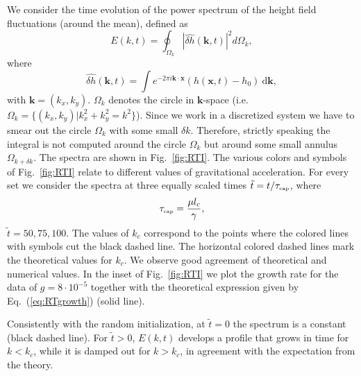 We consider the time evolution of the power spectrum of the height field fluctuations 
(around the mean), defined as 
\begin{equation}\label{eq:powerspec}
    E(k,t) = \oint_{\Omega_k} |\hat{\delta h}(\mathbf{k},t)|^2 d\Omega_k,
\end{equation}
where
\begin{equation}\label{eq:spectra}
    \hat{\delta h}(\mathbf{k},t) = \int e^{-2\pi i\mathbf{k}\cdot\mathbf{x}} (h(\mathbf{x},t)-h_0)~\mathrm{d}\mathbf{k},
\end{equation}
with $\mathbf{k}=(k_x,k_y)$. $\Omega_k$ denotes the circle in $\mathbf{k}$-space (i.e. 
$\Omega_k = \{(k_x, k_y) | k_x^2 + k_y^2 = k^2 \}$). Since we work in a discretized
system we have to smear out the circle $\Omega_k$ with some small $\delta k$. Therefore, strictly speaking 
the integral is not computed around the circle $\Omega_k$ but around some small annulus 
$\Omega_{k + \delta k}$.
The spectra are shown in Fig.~\ref{fig:RTI}. The various colors and symbols of Fig.~\ref{fig:RTI} relate to different values of gravitational acceleration. For every set we consider the spectra at three equally scaled 
times $\tilde{t}=t/\tau_{\mbox{\tiny{cap}}}$, where
\begin{equation}
    \tau_{\mbox{\tiny{cap}}} = \frac{\mu l_c}{\gamma},
\end{equation}
$\tilde{t}=50, 75, 100$. The values of $k_c$ correspond to the points where the colored lines with symbols cut the black dashed line. The horizontal colored dashed lines mark the theoretical values for $k_c$. We observe good agreement of theoretical and numerical values. In the inset of Fig.~\ref{fig:RTI} we plot the growth rate for the data of $g = 8\cdot 10^{-5}$ together with the theoretical expression given by Eq.~(\ref{eq:RTgrowth}) (solid line).

Consistently with the random initialization, at $\tilde{t}=0$ the spectrum is a constant (black dashed line). 
For $\tilde{t}>0$, $E(k,t)$ develops a profile that grows in time for $k<k_c$, while
it is damped out for $k>k_c$, in agreement with the expectation from the theory.

